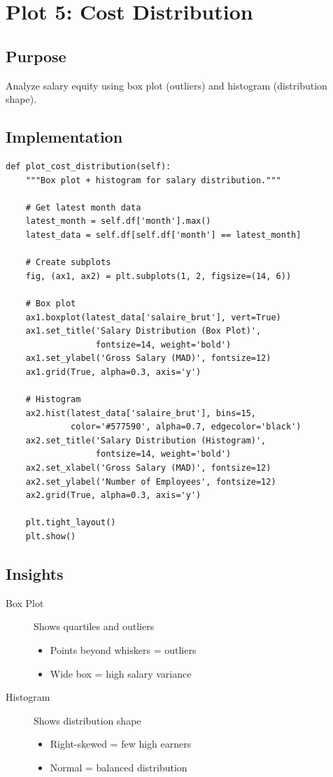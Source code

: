 \section{Plot 5: Cost Distribution}

\subsection{Purpose}
Analyze salary equity using box plot (outliers) and histogram (distribution shape).

\subsection{Implementation}

\begin{lstlisting}[style=pythonstyle]
def plot_cost_distribution(self):
    """Box plot + histogram for salary distribution."""
    
    # Get latest month data
    latest_month = self.df['month'].max()
    latest_data = self.df[self.df['month'] == latest_month]
    
    # Create subplots
    fig, (ax1, ax2) = plt.subplots(1, 2, figsize=(14, 6))
    
    # Box plot
    ax1.boxplot(latest_data['salaire_brut'], vert=True)
    ax1.set_title('Salary Distribution (Box Plot)',
                  fontsize=14, weight='bold')
    ax1.set_ylabel('Gross Salary (MAD)', fontsize=12)
    ax1.grid(True, alpha=0.3, axis='y')
    
    # Histogram
    ax2.hist(latest_data['salaire_brut'], bins=15,
             color='#577590', alpha=0.7, edgecolor='black')
    ax2.set_title('Salary Distribution (Histogram)',
                  fontsize=14, weight='bold')
    ax2.set_xlabel('Gross Salary (MAD)', fontsize=12)
    ax2.set_ylabel('Number of Employees', fontsize=12)
    ax2.grid(True, alpha=0.3, axis='y')
    
    plt.tight_layout()
    plt.show()
\end{lstlisting}

\subsection{Insights}

\begin{description}
    \item[Box Plot] Shows quartiles and outliers
    \begin{itemize}
        \item Points beyond whiskers = outliers
        \item Wide box = high salary variance
    \end{itemize}
    
    \item[Histogram] Shows distribution shape
    \begin{itemize}
        \item Right-skewed = few high earners
        \item Normal = balanced distribution
    \end{itemize}
\end{description}

